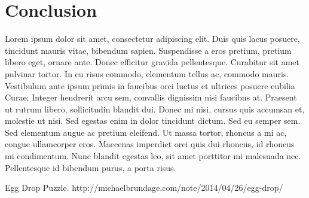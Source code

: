 \documentclass[12pt,a4paper,oneside]{report}
\begin{document}

\chapter{Conclusion}
Lorem ipsum dolor sit amet, consectetur adipiscing elit. Duis quis lacus posuere, tincidunt mauris vitae, bibendum sapien. Suspendisse a eros pretium, pretium libero eget, ornare ante. Donec efficitur gravida pellentesque. Curabitur sit amet pulvinar tortor. In eu risus commodo, elementum tellus ac, commodo mauris. Vestibulum ante ipsum primis in faucibus orci luctus et ultrices posuere cubilia Curae; Integer hendrerit arcu sem, convallis dignissim nisi faucibus at. Praesent ut rutrum libero, sollicitudin blandit dui. Donec mi nisi, cursus quis accumsan et, molestie ut nisi. Sed egestas enim in dolor tincidunt dictum. Sed eu semper sem. Sed elementum augue ac pretium eleifend. Ut massa tortor, rhoncus a mi ac, congue ullamcorper eros. Maecenas imperdiet orci quis dui rhoncus, id rhoncus mi condimentum. Nunc blandit egestas leo, sit amet porttitor mi malesuada nec. Pellentesque id bibendum purus, a porta risus.


\renewcommand{\bibname}{References}
\begin{thebibliography}{1} 
	 Egg Drop Puzzle. http://michaelbrundage.com/note/2014/04/26/egg-drop/
\end{thebibliography}

\end{document}
